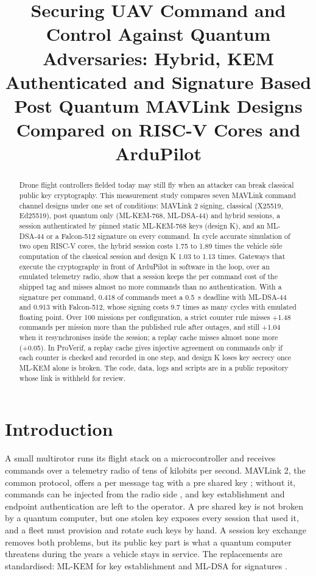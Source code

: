 \documentclass[conference]{IEEEtran}
\begin{document}
\title{Securing UAV Command and Control Against Quantum Adversaries: Hybrid, KEM Authenticated and Signature Based Post Quantum MAVLink Designs Compared on RISC-V Cores and ArduPilot}
\author{}
\maketitle

\begin{abstract}
Drone flight controllers fielded today may still fly when an attacker can break classical public key cryptography. This measurement study compares seven MAVLink command channel designs under one set of conditions: MAVLink 2 signing, classical (X25519, Ed25519), post quantum only (ML-KEM-768, ML-DSA-44) and hybrid sessions, a session authenticated by pinned static ML-KEM-768 keys (design K), and an ML-DSA-44 or a Falcon-512 signature on every command. In cycle accurate simulation of two open RISC-V cores, the hybrid session costs 1.75 to 1.89 times the vehicle side computation of the classical session and design K 1.03 to 1.13 times. Gateways that execute the cryptography in front of ArduPilot in software in the loop, over an emulated telemetry radio, show that a session keeps the per command cost of the shipped tag and misses almost no more commands than no authentication. With a signature per command, 0.418 of commands meet a 0.5~s deadline with ML-DSA-44 and 0.913 with Falcon-512, whose signing costs 9.7 times as many cycles with emulated floating point. Over 100 missions per configuration, a strict counter rule misses \mbox{+1.48} commands per mission more than the published rule after outages, and still \mbox{+1.04} when it resynchronises inside the session; a replay cache misses almost none more (\mbox{+0.05}). In ProVerif, a replay cache gives injective agreement on commands only if each counter is checked and recorded in one step, and design K loses key secrecy once ML-KEM alone is broken. The code, data, logs and scripts are in a public repository whose link is withheld for review.
\end{abstract}

\section{Introduction}
A small multirotor runs its flight stack on a microcontroller and receives commands over a telemetry radio of tens of kilobits per second. MAVLink 2, the common protocol, offers a per message tag with a pre shared key \cite{mavsign}; without it, commands can be injected from the radio side \cite{kwon18,koubaa19}, and key establishment and endpoint authentication are left to the operator. A pre shared key is not broken by a quantum computer, but one stolen key exposes every session that used it, and a fleet must provision and rotate such keys by hand. A session key exchange removes both problems, but its public key part is what a quantum computer threatens during the years a vehicle stays in service. The replacements are standardised: ML-KEM for key establishment \cite{fips203} and ML-DSA for signatures \cite{fips204}.
\end{document}
